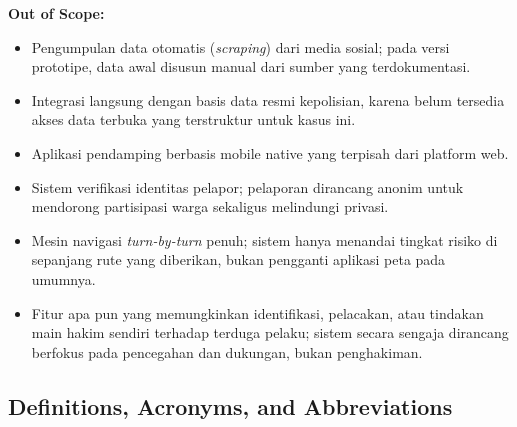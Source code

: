 \documentclass[11pt,a4paper]{article}
\begin{document}
\noindent
\textbf{Out of Scope:}
\begin{itemize}
  \item Pengumpulan data otomatis (\textit{scraping}) dari media sosial; pada versi prototipe, data awal disusun manual dari sumber yang terdokumentasi.
  \item Integrasi langsung dengan basis data resmi kepolisian, karena belum tersedia akses data terbuka yang terstruktur untuk kasus ini.
  \item Aplikasi pendamping berbasis mobile native yang terpisah dari platform web.
  \item Sistem verifikasi identitas pelapor; pelaporan dirancang anonim untuk mendorong partisipasi warga sekaligus melindungi privasi.
  \item Mesin navigasi \textit{turn-by-turn} penuh; sistem hanya menandai tingkat risiko di sepanjang rute yang diberikan, bukan pengganti aplikasi peta pada umumnya.
  \item Fitur apa pun yang memungkinkan identifikasi, pelacakan, atau tindakan main hakim sendiri terhadap terduga pelaku; sistem secara sengaja dirancang berfokus pada pencegahan dan dukungan, bukan penghakiman.
\end{itemize}

\subsection{Definitions, Acronyms, and Abbreviations}
\end{document}
